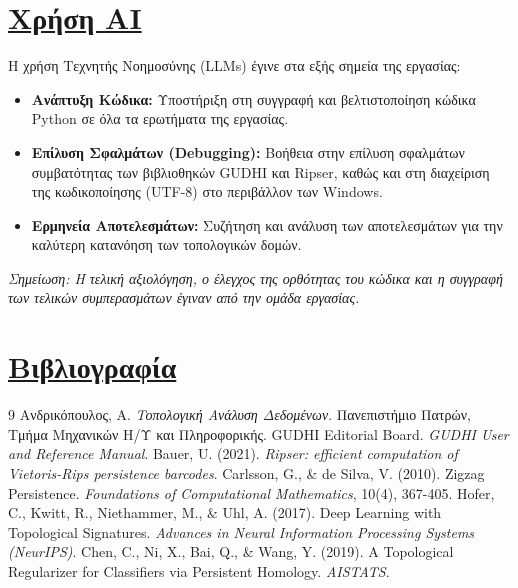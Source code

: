 \documentclass[12pt]{article}
\newcommand{\en}[1]{\foreignlanguage{english}{#1}}
\begin{document}
\newpage
\section{\texorpdfstring{\underline{Χρήση \en{AI}}}{Χρήση AI}}
\vspace{1em}
Η χρήση Τεχνητής Νοημοσύνης (\foreignlanguage{english}{LLMs}) έγινε στα εξής σημεία της εργασίας:

\begin{itemize}
    \item \textbf{Ανάπτυξη Κώδικα:} Υποστήριξη στη συγγραφή και βελτιστοποίηση κώδικα \foreignlanguage{english}{Python} σε όλα τα ερωτήματα της εργασίας.
    \item \textbf{Επίλυση Σφαλμάτων (\foreignlanguage{english}{Debugging}):} Βοήθεια στην επίλυση σφαλμάτων συμβατότητας των βιβλιοθηκών \foreignlanguage{english}{GUDHI} και \foreignlanguage{english}{Ripser}, καθώς και στη διαχείριση της κωδικοποίησης (\foreignlanguage{english}{UTF-8}) στο περιβάλλον των \foreignlanguage{english}{Windows}.
    \item \textbf{Ερμηνεία Αποτελεσμάτων:} Συζήτηση και ανάλυση των αποτελεσμάτων για την καλύτερη κατανόηση των τοπολογικών δομών.
\end{itemize}

\textit{Σημείωση: Η τελική αξιολόγηση, ο έλεγχος της ορθότητας του κώδικα και η συγγραφή των τελικών συμπερασμάτων έγιναν από την ομάδα εργασίας.}

\newpage
\section{\texorpdfstring{\underline{Βιβλιογραφία}}{Βιβλιογραφία}}
\vspace{1em}
\begin{thebibliography}{9}
 Ανδρικόπουλος, Α. \emph{Τοπολογική Ανάλυση Δεδομένων}. Πανεπιστήμιο Πατρών, Τμήμα Μηχανικών Η/Υ και Πληροφορικής.
 \foreignlanguage{english}{GUDHI Editorial Board}. \emph{\foreignlanguage{english}{GUDHI User and Reference Manual}}.
 \foreignlanguage{english}{Bauer, U.} (2021). \emph{\foreignlanguage{english}{Ripser: efficient computation of Vietoris-Rips persistence barcodes}}.
 \en{Carlsson, G., \& de Silva, V. (2010). Zigzag Persistence. \emph{Foundations of Computational Mathematics}, 10(4), 367-405.}
 \en{Hofer, C., Kwitt, R., Niethammer, M., \& Uhl, A. (2017). Deep Learning with Topological Signatures. \emph{Advances in Neural Information Processing Systems (NeurIPS)}.}
 \en{Chen, C., Ni, X., Bai, Q., \& Wang, Y. (2019). A Topological Regularizer for Classifiers via Persistent Homology. \emph{AISTATS}.}
\end{thebibliography}
\end{document}
